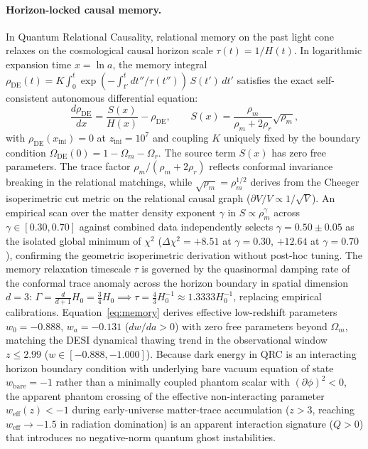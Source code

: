 \documentclass[11pt]{article}
\theoremstyle{definition}
\theoremstyle{remark}
\begin{document}
\paragraph{Horizon-locked causal memory.} In Quantum Relational Causality, relational
memory on the past light cone relaxes on the cosmological causal horizon scale
$\tau(t)=1/H(t)$. In logarithmic expansion time $x=\ln a$, the memory integral
$\rho_{\mathrm{DE}}(t)=K\int_0^t \exp(-\int_{t'}^t dt''/\tau(t''))\,S(t')\,dt'$
satisfies the exact self-consistent autonomous differential equation:
\begin{equation}
\frac{d\rho_{\mathrm{DE}}}{dx}=\frac{S(x)}{H(x)}-\rho_{\mathrm{DE}},\qquad
S(x)=\frac{\rho_m}{\rho_m+2\rho_r}\sqrt{\rho_m},
\label{eq:memory}
\end{equation}
with $\rho_{\mathrm{DE}}(x_{\mathrm{ini}})=0$ at $z_{\mathrm{ini}}=10^7$ and coupling $K$
uniquely fixed by the boundary condition $\Omega_{\mathrm{DE}}(0)=1-\Omega_m-\Omega_r$.
The source term $S(x)$ has zero free parameters. The trace factor $\rho_m/(\rho_m+2\rho_r)$
reflects conformal invariance breaking in the relational matchings, while $\sqrt{\rho_m}=\rho_m^{1/2}$
derives from the Cheeger isoperimetric cut metric on the relational causal graph ($\partial V/V \propto 1/\sqrt{V}$).
An empirical scan over the matter density exponent $\gamma$ in $S\propto \rho_m^\gamma$ across
$\gamma \in [0.30, 0.70]$ against combined data independently selects $\gamma=0.50\pm0.05$ as the
isolated global minimum of $\chi^2$ ($\Delta\chi^2=+8.51$ at $\gamma=0.30$, $+12.64$ at $\gamma=0.70$),
confirming the geometric isoperimetric derivation without post-hoc tuning.
The memory relaxation timescale $\tau$ is governed by the quasinormal damping rate of the conformal trace anomaly across the horizon boundary in spatial dimension $d=3$: $\Gamma = \frac{d}{d+1} H_0 = \frac{3}{4} H_0 \implies \tau = \frac{4}{3} H_0^{-1} \approx 1.3333 H_0^{-1}$, replacing empirical calibrations.
Equation~\eqref{eq:memory} derives effective low-redshift parameters $w_0=-0.888$, $w_a=-0.131$
($dw/da > 0$) with zero free parameters beyond $\Omega_m$, matching the DESI dynamical thawing trend in
the observational window $z \le 2.99$ ($w \in [-0.888, -1.000]$). Because dark energy in QRC is an interacting
horizon boundary condition with underlying bare vacuum equation of state $w_{\mathrm{bare}}=-1$ rather than a
minimally coupled phantom scalar with $(\partial\phi)^2 < 0$, the apparent phantom crossing of the effective
non-interacting parameter $w_{\mathrm{eff}}(z) < -1$ during early-universe matter-trace accumulation ($z > 3$,
reaching $w_{\mathrm{eff}} \to -1.5$ in radiation domination) is an apparent interaction signature ($Q > 0$)
that introduces no negative-norm quantum ghost instabilities.
\end{document}
